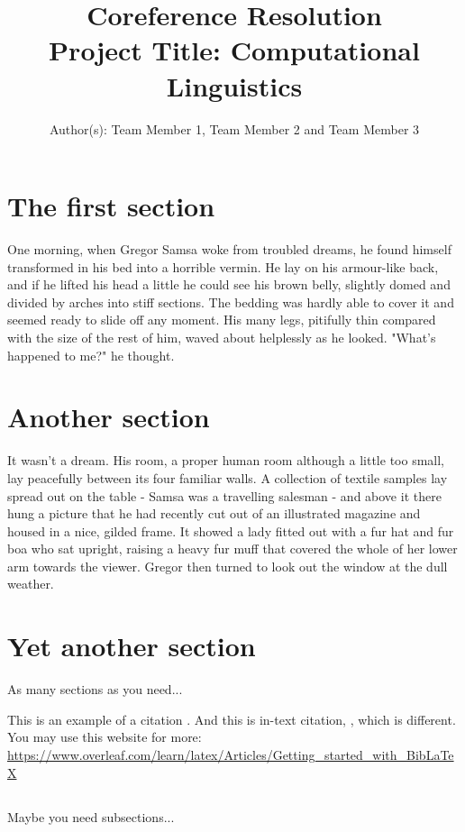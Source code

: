 \documentclass[11pt]{article}
\title{{\LARGE Coreference Resolution}\\[1.5mm]
{\large Project Title: Computational Linguistics}\\[1.5mm]} %
\author{Author(s): Team Member 1, Team Member 2 and Team Member 3}%
\date{} %
\begin{document}
\maketitle


\section{The first section}

One morning, when Gregor Samsa woke from troubled dreams, he found himself
transformed in his bed into a horrible vermin. He lay on his armour-like back,
and if he lifted his head a little he could see his brown belly, slightly domed
and divided by arches into stiff sections. The bedding was hardly able to cover
it and seemed ready to slide off any moment. His many legs, pitifully thin
compared with the size of the rest of him, waved about helplessly as he looked.
"What's happened to me?" he thought. 


\section{Another section} It wasn't a dream. His room, a proper human room
although a little too small, lay peacefully between its four familiar walls. A
collection of textile samples lay spread out on the table - Samsa was a
travelling salesman - and above it there hung a picture that he had recently cut
out of an illustrated magazine and housed in a nice, gilded frame. It showed a
lady fitted out with a fur hat and fur boa who sat upright, raising a heavy fur
muff that covered the whole of her lower arm towards the viewer. Gregor then
turned to look out the window at the dull weather. 

\section{Yet another section}

As many sections as you need... 

This is an example of a citation \parencite{raghunathan-etal-2010-multi}. And
this is in-text citation,  \cite{raghunathan-etal-2010-multi}, which is
different. You may use this website for more:
\url{https://www.overleaf.com/learn/latex/Articles/Getting_started_with_BibLaTeX}


\subsection{}

Maybe you need subsections... 

\printbibliography
\end{document}
